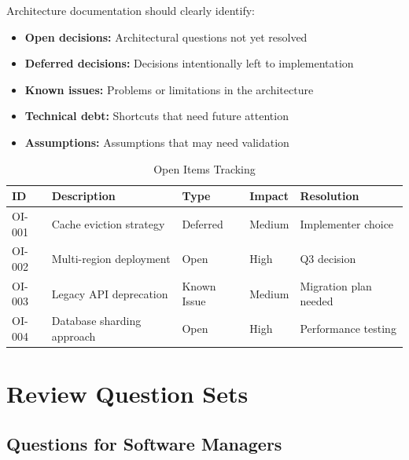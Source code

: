 \documentclass[11pt]{article}
\begin{document}
Architecture documentation should clearly identify:

\begin{itemize}
    \item \textbf{Open decisions:} Architectural questions not yet resolved
    \item \textbf{Deferred decisions:} Decisions intentionally left to implementation
    \item \textbf{Known issues:} Problems or limitations in the architecture
    \item \textbf{Technical debt:} Shortcuts that need future attention
    \item \textbf{Assumptions:} Assumptions that may need validation
\end{itemize}

\begin{longtable}{@{}L{1.5cm} L{3.5cm} L{3cm} L{2cm} L{2.5cm}@{}}
\caption{Open Items Tracking} \\
\toprule
\textbf{ID} & \textbf{Description} & \textbf{Type} & \textbf{Impact} & \textbf{Resolution} \\
\midrule
\endfirsthead
\bottomrule
\endlastfoot
OI-001 & Cache eviction strategy & Deferred & Medium & Implementer choice \\
OI-002 & Multi-region deployment & Open & High & Q3 decision \\
OI-003 & Legacy API deprecation & Known Issue & Medium & Migration plan needed \\
OI-004 & Database sharding approach & Open & High & Performance testing \\
\end{longtable}

\section{Review Question Sets}

\subsection{Questions for Software Managers}
\end{document}
